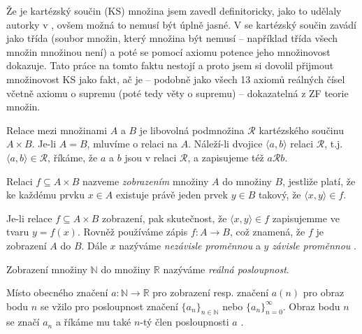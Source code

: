 \begin{remark}\label{rem:mnozinovost_KS}
Že je kartézský součin (KS) množina jsem zavedl definitoricky, jako to udělaly autorky v \cite{EPJVMAI}, ovšem možná to nemusí být úplně jasné. V \cite{TeMno} se kartézský součin zavádí jako třída (soubor množin, který množina být nemusí -- například třída všech množin množinou není) a poté se pomocí axiomu potence jeho množinovost dokazuje. Tato práce na tomto faktu nestojí a proto jsem si dovolil přijmout množinovost KS jako fakt, ač je -- podobně jako všech 13 axiomů reálných čísel včetně axiomu o supremu (poté tedy věty o supremu) \cite{DK:DPFJP} -- dokazatelná z ZF teorie množin.
\end{remark}

\begin{definition}
Relace mezi množinami $A$ a $B$ je libovolná podmnožina $\mathcal{R}$ kartézského součinu $A\times B$. Je-li $A=B$, mluvíme o relaci na $A$. Náleží-li dvojice $\langle a, b \rangle$ relaci $\mathcal{R}$, t.j. $\langle a,b \rangle \in \mathcal{R}$, říkáme, že $a$ a $b$ jsou v relaci $\mathcal{R}$, a zapisujeme též $a\mathcal{R}b$.
\end{definition}

\begin{definition}
Relaci $f \subseteq A \times B$ nazveme \textit{zobrazením} množiny $A$ do množiny $B$, jestliže platí, že ke každému prvku $x \in A$ existuje právě jeden prvek $y \in B$ takový, že $\langle x, y \rangle \in f$.
\end{definition}

Je-li relace $f \subseteq A \times B$ zobrazení, pak skutečnost, že $\langle x, y \rangle \in f$ zapisujemme ve tvaru $y = f(x)$. Rovněž používáme zápis $f:A\rightarrow B$, což znamená, že $f$ je zobrazení $A$ do $B$. Dále $x$ nazýváme \textit{nezávisle proměnnou} a $y$ \textit{závisle proměnnou} \cite{DK:DPFJP}.

\begin{definition}
Zobrazení množiny $\mathbb{N}$ do množiny $\mathbb{R}$ nazýváme \textit{reálná posloupnost}.
\end{definition}

Místo obecného značení $a:\mathbb{N}\rightarrow\mathbb{R}$ pro zobrazení resp. značení $a(n)$ pro obraz bodu $n$ se vžilo pro posloupnost značení $\{a_n\}_{n\in\mathbb{N}}$ nebo $\{a_n\}_{n=0}^{\infty}$. Obraz bodu $n$ se značí $a_n$ a říkáme mu také $n$-tý člen posloupnosti $a$ \cite{EPJVMAI}. 

